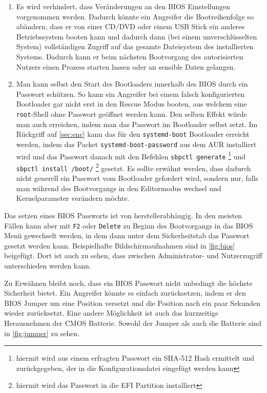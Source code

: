 \begin{enumerate}
	\item Es wird verhindert, dass Veränderungen an den \ac{BIOS} Einstellungen vorgenommen werden. Dadurch könnte ein Angreifer die Bootreihenfolge so abändern, dass er von einer CD/DVD oder einem USB Stick ein anderes Betriebssystem booten kann und dadurch dann {\small(bei einem unverschlüsselten System)} vollständigen Zugriff auf das gesamte Dateisystem des installierten Systems. Dadurch kann er beim nächsten Bootvorgang des autorisierten Nutzers einen Prozess starten lassen oder an sensible Daten gelangen.
	\item Man kann selbst den Start des Bootloaders innerhalb des \ac{BIOS} durch ein Passwort schützen. So kann ein Angreifer bei einem falsch konfigurierten Bootloader gar nicht erst in den Rescue Modus booten, aus welchem eine \texttt{root}-Shell ohne Passwort geöffnet werden kann.\cite{HowBootRoot2011} Den selben Effekt würde man auch erreichen, indem man das Passwort im Bootloader selbst setzt. Im Rückgriff auf \autoref{sec:enc} kann das für den \texttt{systemd-boot} Bootloader erreicht werden, indem das Packet \texttt{systemd-boot-password} aus dem \ac{AUR} installiert wird und das Passwort danach mit den Befehlen \texttt{sbpctl generate} \footnote{hiermit wird aus einem erfragten Passwort ein SHA-512 Hash ermittelt und zurückgegeben, der in die Konfigurationsdatei eingefügt werden kann} und \texttt{sbpctl install /boot/} \footnote{hiermit wird das Passwort in die EFI Partition installiert} gesetzt. Es sollte erwähnt werden, dass dadurch nicht generell ein Passwort vom Bootloader gefordert wird, sondern nur, falls man während des Bootvorgangs in den Editormodus wechsel und Kernelparameter verändern möchte.
\end{enumerate}

Das setzen eines \ac{BIOS} Passworts ist von herstellerabhängig. In den meisten Fällen kann aber mit \texttt{F2} oder \texttt{Delete} zu Beginn des Bootvorgangs in das \ac{BIOS} Menü gewechselt werden, in dem dann unter dem Sicherheitstab das Passwort gesetzt werden kann. Beispielhafte Bildschirmaufnahmen sind in \autoref{fig:bios} beigefügt. Dort ist auch zu sehen, dass zwischen Administrator- und Nutzerzugriff unterschieden werden kann.

Zu Erwähnen bleibt noch, dass ein \ac{BIOS} Passwort nicht unbedingt die höchste Sicherheit bietet. Ein Angreifer könnte es einfach zurücksetzen, indem er den \ac{BIOS} Jumper um eine Position versetzt und die Position nach ein paar Sekunden wieder zurücksetzt. Eine andere Möglichkeit ist auch das kurzzeitige Herausnehmen der \acs{CMOS} Batterie.\cite{UltimateGuideRemoving2015} Sowohl der Jumper als auch die Batterie sind in \autoref{fig:jumper} zu sehen.

